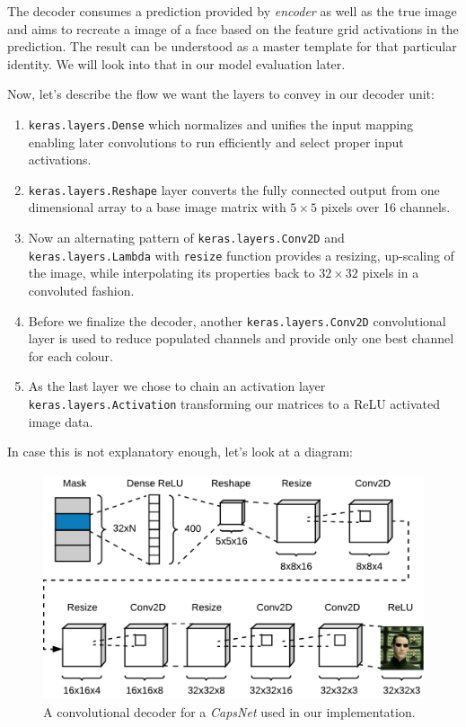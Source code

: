 The decoder consumes a prediction provided by \textit{encoder} as well as the true image and aims to recreate a image of a face based on the feature grid activations in the prediction. The result can be understood as a master template for that particular identity. We will look into that in our model evaluation later.

Now, let's describe the flow we want the layers to convey in our decoder unit:

\begin{enumerate}
    \item \texttt{keras.layers.Dense} which normalizes and unifies the input mapping enabling later convolutions to run efficiently and select proper input activations.
    \item \texttt{keras.layers.Reshape} layer converts the fully connected output from one dimensional array to a base image matrix with $5\times5$ pixels over 16 channels.
    \item Now an alternating pattern of \texttt{keras.layers.Conv2D} and \texttt{keras.layers.Lambda} with \texttt{resize} function provides a resizing, up-scaling of the image, while interpolating its properties back to $32\times32$ pixels in a convoluted fashion.
    \item Before we finalize the decoder, another \texttt{keras.layers.Conv2D} convolutional layer is used to reduce populated channels and provide only one best channel for each colour.
    \item As the last layer we chose to chain an activation layer \texttt{keras.layers.Activation} transforming our matrices to a ReLU activated image data.
\end{enumerate}

In case this is not explanatory enough, let's look at a diagram:

\begin{figure}[ht]
    \centering
    \includegraphics[height=18em]{obrazky-figures/my_decoder.pdf}
    \caption{A convolutional decoder for a \textit{CapsNet} used in our implementation.}
    \label{fig:my_decoder}
\end{figure}

